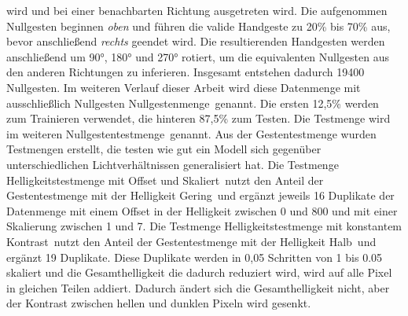 wird und bei einer benachbarten Richtung ausgetreten wird. Die aufgenommen Nullgesten beginnen \textit{oben} und führen die valide Handgeste zu 20\% bis 70\% aus, bevor anschließend \textit{rechts}
geendet wird. Die resultierenden Handgesten werden anschließend um 90°, 180° und 270° rotiert, um die equivalenten Nullgesten aus den anderen Richtungen zu inferieren. Insgesamt entstehen dadurch 19400
Nullgesten. Im weiteren Verlauf dieser Arbeit wird diese Datenmenge mit ausschließlich Nullgesten \glqq Nullgestenmenge\grqq\ genannt. Die ersten 12,5\% werden zum Trainieren verwendet, die hinteren 87,5\% zum
Testen. Die Testmenge wird im weiteren \glqq Nullgestentestmenge\grqq\ genannt.
\newline
\newline
Aus der Gestentestmenge wurden Testmengen erstellt, die testen wie gut ein Modell sich gegenüber unterschiedlichen Lichtverhältnissen generalisiert hat. Die Testmenge \glqq Helligkeitstestmenge mit Offset und Skaliert\grqq\
nutzt den Anteil der Gestentestmenge mit der Helligkeit \glqq Gering\grqq\ und ergänzt jeweils 16 Duplikate der Datenmenge mit einem Offset in der Helligkeit zwischen 0 und 800 und mit einer Skalierung
zwischen 1 und 7. Die Testmenge \glqq Helligkeitstestmenge mit konstantem Kontrast\grqq\ nutzt den Anteil der Gestentestmenge mit der Helligkeit \glqq Halb\grqq\ und ergänzt 19 Duplikate. Diese Duplikate werden in 0,05 Schritten
von 1 bis 0.05 skaliert und die Gesamthelligkeit die dadurch reduziert wird, wird auf alle Pixel in gleichen Teilen addiert. Dadurch ändert sich die Gesamthelligkeit nicht, aber der Kontrast zwischen hellen
und dunklen Pixeln wird gesenkt.